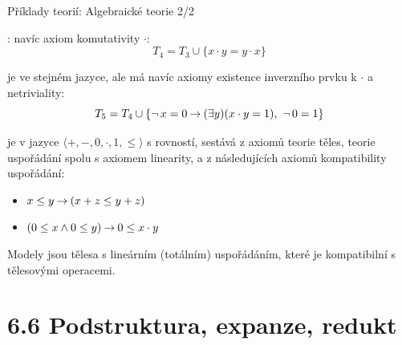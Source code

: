 \documentclass{beamer}
\begin{document}
\begin{frame}{Příklady teorií: Algebraické teorie 2/2}
    
    \pause
    : navíc axiom \alert{komutativity $\cdot$}:
    \pause
    {\small
    $$
    T_4 = T_3 \cup \{x \cdot y = y \cdot x\}
    $$
    }
    
    \pause
     je ve stejném jazyce, ale má navíc axiomy \alert{existence inverzního prvku k $\cdot$} a \alert{netriviality}:
    \pause
    {\small
    $$
    T_5 = T_4 \cup \{\neg\,x=0 \mathbin{\rightarrow} (\exists y)(x\cdot y = 1),\ \neg\,0=1\}
    $$
    }

    \pause
     je v jazyce $\langle +, -, 0,\cdot,1,\leq\rangle$ s rovností, sestává z axiomů teorie těles, teorie uspořádání spolu s axiomem linearity, a z následujících axiomů \alert{kompatibility uspořádání}: 

    \begin{itemize}
        \item $x\leq y\mathbin{\rightarrow} (x+z\leq y+z)$
        \item $(0\leq x\land 0\leq y)\mathbin{\rightarrow} 0\leq x\cdot y$
    \end{itemize}

    \pause
    Modely jsou tělesa s \alert{lineárním (totálním)} uspořádáním, které je kompatibilní s tělesovými operacemi.

\end{frame}


\section{6.6 Podstruktura, expanze, redukt}
\end{document}
